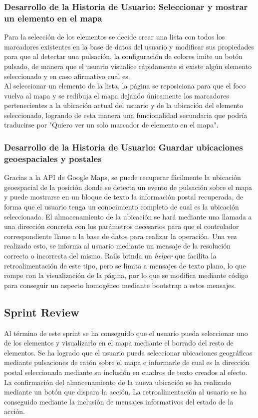 	\subsubsection{Desarrollo de la Historia de Usuario: Seleccionar y mostrar un elemento en el mapa}
	Para la selección de los elementos se decide crear una lista con todos los marcadores existentes en la base de datos del usuario y modificar sus propiedades para que al detectar una pulsación, la configuración de colores imite un botón pulsado, de manera que el usuario visualice rápidamente si existe algún elemento seleccionado y en caso afirmativo cual es. \\
	Al seleccionar un elemento de la lista, la página se reposiciona para que el foco vuelva al mapa y se redibuja el mapa dejando únicamente los marcadores pertenecientes a la ubicación actual del usuario y de la ubicación del elemento seleccionado, logrando de esta manera una funcionalidad secundaria que podría traducirse por "Quiero ver un solo marcador de elemento en el mapa".\\
	
	\subsubsection{Desarrollo de la Historia de Usuario: Guardar ubicaciones geoespaciales y postales}
	
	Gracias a la API de Google Maps, se puede recuperar fácilmente la ubicación geoespacial de la posición donde se detecta un evento de pulsación sobre el mapa y puede mostrarse en un bloque de texto la información postal recuperada, de forma que el usuario tenga un conocimiento completo de cual es la ubicación seleccionada.
	El almacenamiento de la ubicación se hará mediante una llamada a una dirección concreta con los parámetros necesarios para que el controlador correspondiente llame a la base de datos para realizar la operación. Una vez realizado esto, se informa al usuario mediante un mensaje de la resolución correcta o incorrecta del mismo. Rails brinda un \textit{helper} que facilita la retroalimentación de este tipo, pero se limita a mensajes de texto plano, lo que rompe con la visualización de la página, por lo que se modifica mediante código para conseguir un aspecto homogéneo mediante bootstrap a estos mensajes.
		
	\subsection{Sprint Review}
	Al término de este sprint se ha conseguido que el usuario pueda seleccionar uno de los elementos y visualizarlo en el mapa mediante el borrado del resto de elementos. Se ha logrado que el usuario pueda seleccionar ubicaciones geográficas mediante pulsaciones de ratón sobre el mapa e informarle de cual es la dirección postal seleccionada mediante su inclusión en cuadros de texto creados al efecto. La confirmación del almacenamiento de la nueva ubicación se ha realizado mediante un botón que dispara la acción. La retroalimentación al usuario se ha conseguido mediante la inclusión de mensajes informativos del estado de la acción. 

